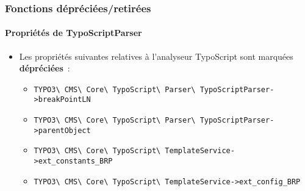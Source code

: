 %

\begin{frame}[fragile]
	\frametitle{Fonctions dépréciées/retirées}
	\framesubtitle{Propriétés de TypoScriptParser}

	\begin{itemize}
		\item Les propriétés suivantes relatives à l'analyseur TypoScript sont
			marquées \textbf{dépréciées}~:
			\vspace{0.2cm}
			\begin{itemize}\smaller
				\item \texttt{TYPO3\textbackslash
					CMS\textbackslash
					Core\textbackslash
					TypoScript\textbackslash
					Parser\textbackslash
					TypoScriptParser->breakPointLN}
				\item \texttt{TYPO3\textbackslash
					CMS\textbackslash
					Core\textbackslash
					TypoScript\textbackslash
					Parser\textbackslash
					TypoScriptParser->parentObject}
				\item \texttt{TYPO3\textbackslash
					CMS\textbackslash
					Core\textbackslash
					TypoScript\textbackslash
					TemplateService->ext\_constants\_BRP}
				\item \texttt{TYPO3\textbackslash
					CMS\textbackslash
					Core\textbackslash
					TypoScript\textbackslash
					TemplateService->ext\_config\_BRP}
			\end{itemize}

	\end{itemize}

\end{frame}

